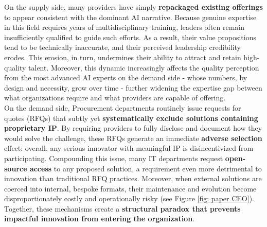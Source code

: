 \documentclass{article}
\begin{document}
On the supply side, many providers have simply \textbf{repackaged existing offerings} to appear consistent with the dominant AI narrative. Because genuine expertise in this field requires years of multidisciplinary training, leaders often remain insufficiently qualified to guide such efforts. As a result, their value propositions tend to be technically inaccurate, and their perceived leadership credibility erodes. This erosion, in turn, undermines their ability to attract and retain high-quality talent. Moreover, this dynamic increasingly affects the quality perception from the most advanced AI experts on the demand side - whose numbers, by design and necessity, grow over time - further widening the expertise gap between what organizations require and what providers are capable of offering.\\

On the demand side, Procurement departments routinely issue requests for quotes (RFQs) that subtly yet \textbf{systematically exclude solutions containing proprietary IP}. By requiring providers to fully disclose and document how they would solve the challenge, these RFQs generate an immediate \textbf{adverse selection} effect: overall, any serious innovator with meaningful IP is disincentivized from participating. Compounding this issue, many IT departments request \textbf{open-source access} to any proposed solution, a requirement even more detrimental to innovation than traditional RFQ practices. Moreover, when external solutions are coerced into internal, bespoke formats, their maintenance and evolution become disproportionately costly and operationally risky (see Figure \ref{fig: paper CEO}). Together, these mechanisms create a \textbf{structural paradox that prevents impactful innovation from entering the organization}.\\
\end{document}
